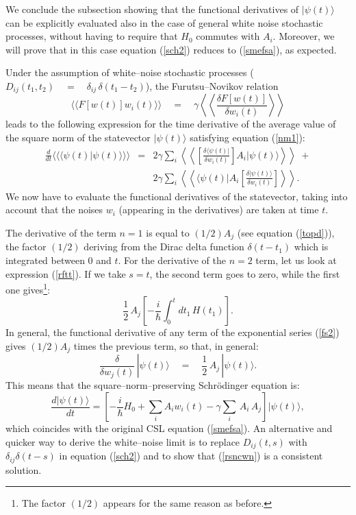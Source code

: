 \documentclass[12pt]{article}
\newcommand{\llangle}{\langle\!\langle}
\newcommand{\rrangle}{\rangle\!\rangle}
\newcommand{\LLangle}{\left\langle\!\!\!\left\langle}
\newcommand{\RRangle}{\right\rangle\!\!\!\right\rangle}
\begin{document}
We conclude the subsection showing that the functional derivatives
of $|\psi(t)\rangle$ can be explicitly evaluated also in the case
of general white noise stochastic processes,  without having to
require that $H_{0}$ commutes with $A_{i}$. Moreover, we will
prove that in this case equation (\ref{sch2}) reduces to
(\ref{smefsa}), as expected.

Under the assumption of white--noise stochastic processes
($D_{ij}(t_{1}, t_{2}) \quad = \quad \delta_{ij}\,\delta(t_{1} -
t_{2})$), the Furutsu--Novikov relation
\begin{equation} \label{fnwn}
\llangle F[w(t)]w_{i}(t) \rrangle \quad = \quad \gamma \LLangle
\frac{\delta F[w(t)]}{\delta w_{i}(t)} \RRangle
\end{equation}
leads to the following expression for the time derivative of the
average value of the square norm of the statevector
$|\psi(t)\rangle$ satisfying equation (\ref{nm1}):
\begin{eqnarray} \label{ie2wn}
\frac{d}{dt}\llangle\langle\psi(t)|\psi(t)\rangle\rrangle & = &
2\gamma \sum_{i} \LLangle \left[ \frac{\delta
\langle\psi(t)|}{\delta w_{i}(t)}\right]
A_{i}|\psi(t)\rangle\RRangle  \; + \nonumber \\  &  & 2\gamma
\sum_{i} \LLangle \langle\psi(t)|A_{i} \left[ \frac{\delta
|\psi(t)\rangle}{\delta w_{i}(t)} \right]\RRangle.
\end{eqnarray}
We now have to evaluate the functional derivatives of the
statevector, taking into account that the noises $w_{i}$
(appearing in the derivatives) are taken at time $t$.

The derivative of the term $n=1$ is equal to $(1/2)A_{j}$ (see
equation (\ref{topd})), the factor $(1/2)$ deriving from the Dirac
delta function $\delta(t - t_{1})$ which is integrated between $0$
and $t$. For the derivative of the $n=2$ term, let us look at
expression (\ref{rftt}). If we take $s=t$, the second term goes to
zero, while the first one gives\footnote{The factor $(1/2)$
appears for the same reason as before.}:
\begin{equation}
\frac{1}{2}\, A_{j} \left[ -\frac{i}{\hbar} \int_{0}^{t} dt_{1}\,
H(t_{1}) \right].
\end{equation}
In general, the functional derivative of any term of the
exponential series (\ref{fs2}) gives $(1/2)A_{j}$ times the
previous term, so that, in general:
\begin{equation} \label{rsncwn}
\frac{\delta}{\delta w_{j}(t)}\, |\psi(t)\rangle \quad = \quad
\frac{1}{2}\,A_{j}\, |\psi(t)\rangle.
\end{equation}
This means that the square--norm--preserving Schr\"odinger
equation is:
\begin{equation}\label{sch3}
\frac{d|\psi(t)\rangle}{dt} =  \left[ -\frac{i}{\hbar} H_{0} +
\sum_{i} A_{i}w_{i}(t) - \gamma \sum_{i} \,A_{i}\, A_{j} \right]
|\psi(t)\rangle,
\end{equation}
which coincides with the original CSL equation (\ref{smefsa}). An
alternative and quicker way to derive the white--noise limit is to
replace $D_{ij}(t,s)$ with $\delta_{ij} \delta(t-s)$ in equation
(\ref{sch2}) and to show that (\ref{rsncwn}) is a consistent
solution.
\end{document}
